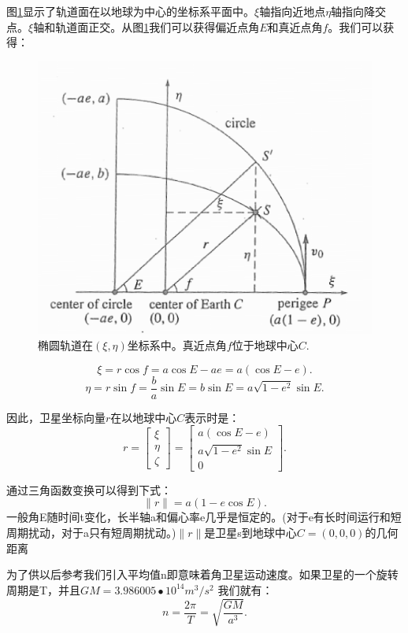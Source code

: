 	图\ref{fig:9-8}显示了轨道面在以地球为中心的坐标系平面中。$\xi$轴指向近地点$\eta$轴指向降交点。$\xi$轴和轨道面正交。从图\ref{fig:9-8}我们可以获得偏近点角$E$和真近点角$f$。我们可以获得：
	\begin{figure}
		\centering
		\includegraphics[width=0.7\linewidth]{TeX_files/Part03/chapter09/image/9-8}
		\caption{椭圆轨道在$(\xi,\eta)$坐标系中。真近点角$f$位于地球中心$C$.}
		\label{fig:9-8}
	\end{figure}
	$$\xi = r \cos f = a \cos E - ae = a (\cos E -e). $$
	$$\eta = r \sin f = \frac{b}{a} \sin E = b \sin E = a\sqrt{1-e^2}\sin E.$$
	
	因此，卫星坐标向量$r$在以地球中心$C$表示时是：
	\begin{equation}\label{eq:9.5}
	r=\begin{bmatrix}
	\xi \\ \eta \\ \zeta
	\end{bmatrix}
	=\begin{bmatrix}
	a(\cos E -e) \\
	a\sqrt{1-e^2}\sin E \\
	0
	\end{bmatrix}.
	\end{equation}
	
	通过三角函数变换可以得到下式：
	\begin{equation}\label{eq:9.6}
	\lVert r \lVert = a(1-e\cos E).
	\end{equation}
	一般角E随时间t变化，长半轴a和偏心率e几乎是恒定的。(对于e有长时间运行和短周期扰动，对于a只有短周期扰动。)$\lVert r \lVert$是卫星s到地球中心$C=(0,0,0)$的几何距离
	
	为了供以后参考我们引入平均值n即意味着角卫星运动速度。如果卫星的一个旋转周期是T，并且$GM = 3.986005 • 10^14 m^3/s^2$ 我们就有：	
	\begin{equation}\label{eq:9.7}
	n = \dfrac{2\pi}{T} = \sqrt{\dfrac{GM}{a^3}}.
	\end{equation}
	
